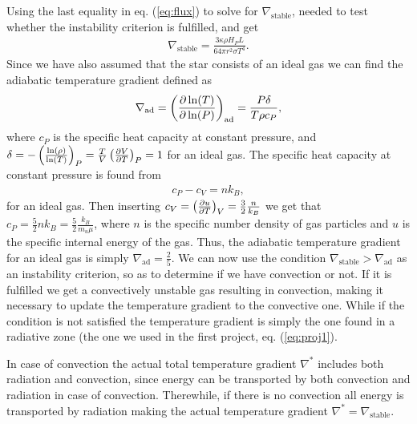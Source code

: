 \documentclass{emulateapj}
\begin{document}
	Using the last equality in eq. (\ref{eq:flux}) to solve for $\nabla_\text{stable}$, needed to test whether the instability criterion is fulfilled, and get 
	\begin{align}
		\nabla_\text{stable} = \frac{3\kappa\rho H_P L}{64\pi r^2\sigma T^4}.
	\end{align}
	Since we have also assumed that the star consists of an ideal gas we can find the adiabatic temperature gradient defined as 
	\begin{align}
		\nabla_\text{ad} = \left(\pdv{\ln(T)}{\ln(P)}\right)_\text{ad} = \frac{P\delta}{T\rho c_P},
	\end{align}	
	where $c_P$ is the specific heat capacity at constant pressure, and $\delta = -\left(\frac{\ln(\rho)}{\ln(T)}\right)_P = \frac{T}{V}\left(\pdv{V}{T}\right)_P = 1$ for an ideal gas. The specific heat capacity at constant pressure is found from 
	\begin{align*}
		c_P - c_V = nk_B,
	\end{align*}
	for an ideal gas. Then inserting $c_V = \left(\pdv{u}{T}\right)_V = \frac{3}{2}\frac{n}{k_B}$ we get that $c_P = \frac{5}{2}n k_B = \frac{5}{2}\frac{k_B}{m_u\mu}$, where $n$ is the specific number density of gas particles and $u$ is the specific internal energy of the gas. 
	Thus, the adiabatic temperature gradient for an ideal gas is simply $\nabla_\text{ad} =\frac{2}{5}$.  We can now use the condition $\nabla_\text{stable}>\nabla_\text{ad}$ as an instability criterion, so as to determine if we have convection or not. If it is fulfilled we get a convectively unstable gas resulting in convection, making it necessary to update the temperature gradient to the convective one. While if the condition is not satisfied the temperature gradient is simply the one found in a radiative zone (the one we used in the first project, eq. (\ref{eq:proj1}). 
	
	In case of convection the actual total temperature gradient $\nabla^*$ includes both radiation and convection, since energy can be transported by both convection and radiation in case of convection. Therewhile, if there is no convection all energy is transported by radiation making the actual temperature gradient $\nabla^* = \nabla_\text{stable}$.  
	
\end{document}
